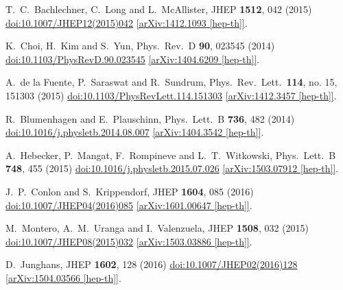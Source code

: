 \documentclass[12pt]{article}
\begin{document}
\begin{thebibliography}{99}
  T.~C.~Bachlechner, C.~Long and L.~McAllister,
  JHEP {\bf 1512}, 042 (2015)
  \href{https://dx.doi.org/10.1007/JHEP12(2015)042}{doi:10.1007/JHEP12(2015)042}
  \href{https://arxiv.org/abs/1412.1093}{[arXiv:1412.1093 [hep-th]]}.

  K.~Choi, H.~Kim and S.~Yun,
  Phys.\ Rev.\ D {\bf 90}, 023545 (2014)
  \href{https://dx.doi.org/10.1103/PhysRevD.90.023545}{doi:10.1103/PhysRevD.90.023545}
  \href{https://arxiv.org/abs/1404.6209}{[arXiv:1404.6209 [hep-th]]}.

  A.~de la Fuente, P.~Saraswat and R.~Sundrum,
  Phys.\ Rev.\ Lett.\  {\bf 114}, no. 15, 151303 (2015)
  \href{https://dx.doi.org/10.1103/PhysRevLett.114.151303}{doi:10.1103/PhysRevLett.114.151303}
  \href{https://arxiv.org/abs/1412.3457}{[arXiv:1412.3457 [hep-th]]}.

  R.~Blumenhagen and E.~Plauschinn,
  Phys.\ Lett.\ B {\bf 736}, 482 (2014)
  \href{https://dx.doi.org/10.1016/j.physletb.2014.08.007}{doi:10.1016/j.physletb.2014.08.007}
  \href{https://arxiv.org/abs/1404.3542}{[arXiv:1404.3542 [hep-th]]}.

  A.~Hebecker, P.~Mangat, F.~Rompineve and L.~T.~Witkowski,
  Phys.\ Lett.\ B {\bf 748}, 455 (2015)
  \href{https://dx.doi.org/10.1016/j.physletb.2015.07.026}{doi:10.1016/j.physletb.2015.07.026}
  \href{https://arxiv.org/abs/1503.07912}{[arXiv:1503.07912 [hep-th]]}.

  J.~P.~Conlon and S.~Krippendorf,
  JHEP {\bf 1604}, 085 (2016)
  \href{https://dx.doi.org/10.1007/JHEP04(2016)085}{doi:10.1007/JHEP04(2016)085}
  \href{https://arxiv.org/abs/1601.00647}{[arXiv:1601.00647 [hep-th]]}.

  M.~Montero, A.~M.~Uranga and I.~Valenzuela,
  JHEP {\bf 1508}, 032 (2015)
  \href{https://dx.doi.org/10.1007/JHEP08(2015)032}{doi:10.1007/JHEP08(2015)032}
  \href{https://arxiv.org/abs/1503.03886}{[arXiv:1503.03886 [hep-th]]}.

  D.~Junghans,
  JHEP {\bf 1602}, 128 (2016)
  \href{https://dx.doi.org/10.1007/JHEP02(2016)128}{doi:10.1007/JHEP02(2016)128}
  \href{https://arxiv.org/abs/1504.03566}{[arXiv:1504.03566 [hep-th]]}.


\end{thebibliography}
\end{document}

